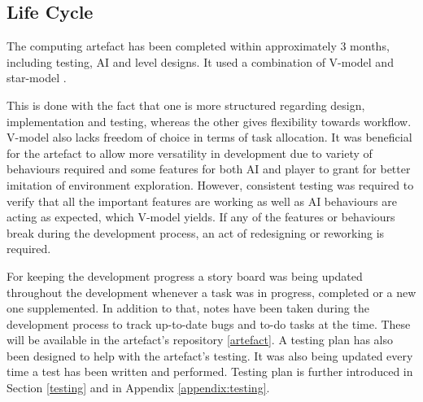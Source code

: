 \documentclass[journal]{IEEEtran}
\begin{document}
\subsection{Life Cycle} %
The computing artefact has been completed within approximately 3 months, including testing, AI and level designs. It used a combination of V-model and star-model \cite{isaias2015information}.

This is done with the fact that one is more structured regarding design, implementation and testing, whereas the other gives flexibility towards workflow. V-model also lacks freedom of choice in terms of task allocation. It was beneficial for the artefact to allow more versatility in development due to variety of behaviours required and some features for both AI and player to grant for better imitation of environment exploration. However, consistent testing was required to verify that all the important features are working as well as AI behaviours are acting as expected, which V-model yields. If any of the features or behaviours break during the development process, an act of redesigning or reworking is required.

For keeping the development progress a story board was being updated throughout the development whenever a task was in progress, completed or a new one supplemented. In addition to that, notes have been taken during the development process to track up-to-date bugs and to-do tasks at the time. These will be available in the artefact's repository \ref{artefact}. A testing plan has also been designed to help with the artefact's testing. It was also being updated every time a test has been written and performed. Testing plan is further introduced in Section \ref{testing} and in Appendix \ref{appendix:testing}. 
\end{document}
